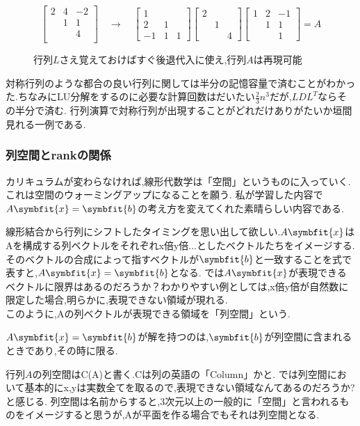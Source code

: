 \begin{figure}[H]\centering
    \[
    \begin{bmatrix}
        2& 4 & -2 \\  & 1 & 1 \\  &  & 4 \\
    \end{bmatrix}
    \quad \longrightarrow \quad
        \begin{bmatrix}
        1 &  &  \\ 2 & 1 &  \\ -1 & 1 & 1
    \end{bmatrix}
    \begin{bmatrix}
        2 & & \\ & 1 & \\ && 4
    \end{bmatrix}
    \begin{bmatrix}
        1& 2 & -1 \\  & 1 & 1 \\  &  & 1 
    \end{bmatrix}=A
    \]
    \caption{行列$L$さえ覚えておけばすぐ後退代入に使え,行列$A$は再現可能}
\end{figure}
対称行列のような都合の良い行列に関しては半分の記憶容量で済むことがわかった.ちなみにLU分解をするのに必要な計算回数はだいたい$\frac{2}{3}n^3$だが,$LDL^T$ならその半分で済む.
行列演算で対称行列が出現することがどれだけありがたいか垣間見れる一例である.
\subsubsection{列空間とrankの関係}\label{subsub:colspace}
カリキュラムが変わらなければ,線形代数学は「空間」というものに入っていく.これは空間のウォーミングアップになることを願う.
私が学習した内容で$A\symbfit{x}=\symbfit{b}$の考え方を変えてくれた素晴らしい内容である.

線形結合から行列にシフトしたタイミングを思い出して欲しい.$A\symbfit{x}$はAを構成する列ベクトルをそれぞれx倍y倍...としたベクトルたちをイメージする.
そのベクトルの合成によって指すベクトルが$\symbfit{b}$と一致することを式で表すと,$A\symbfit{x}=\symbfit{b}$となる.
では$A\symbfit{x}$が表現できるベクトルに限界はあるのだろうか？わかりやすい例としては,x倍y倍が自然数に限定した場合,明らかに,表現できない領域が現れる.\\
このように,Aの列ベクトルが表現できる領域を「列空間」という.
\begin{tcolorbox}[colframe=black!80,colback=white,title={$A\symbfit{x}=\symbfit{b}$における解の存在条件}]
$A\symbfit{x}=\symbfit{b}$が解を持つのは,$\symbfit{b}$が列空間に含まれるときであり,その時に限る.
\end{tcolorbox}
行列$A$の列空間はC(A)と書く.Cは列の英語の「Column」かと.
では列空間において基本的にx,yは実数全てを取るので,表現できない領域なんてあるのだろうか?と感じる.
列空間は名前からすると,3次元以上の一般的に「空間」と言われるものをイメージすると思うが,Aが平面を作る場合でもそれは列空間となる.

